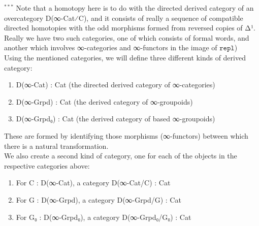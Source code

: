 \documentclass{book}
\theoremstyle{definition}
\begin{document}
${}^{***}$ Note that a homotopy here is to do with the directed derived category of an overcategory D(∞-Cat⁄C), and it consists of really a sequence of compatible directed homotopies with the odd morphisms formed from reversed copies of Δ¹. Really we have two such categories, one of which consists of formal words, and another which involves ∞-categories and ∞-functors in the image of $\texttt{repl}$) \\

Using the mentioned categories, we will define three different kinds of derived category:\\

\begin{enumerate}
\item D(∞-Cat) : Cat (the directed derived category of ∞-categories)
\item D(∞-Grpd) : Cat (the derived category of ∞-groupoids)
\item D(∞-Grpd₀) : Cat (the derived category of based ∞-groupoids)
\end{enumerate}

These are formed by identifying those morphisms (∞-functors) between which there is a natural transformation.\\

We also create a second kind of category, one for each of the objects in the respective categories above:

\begin{enumerate}
\item For C : D(∞-Cat), a category D(∞-Cat/C) : Cat
\item For G : D(∞-Grpd), a category D(∞-Grpd/G) : Cat
\item For G₀ : D(∞-Grpd₀), a category D(∞-Grpd₀/G₀) : Cat
\end{enumerate}
\end{document}
